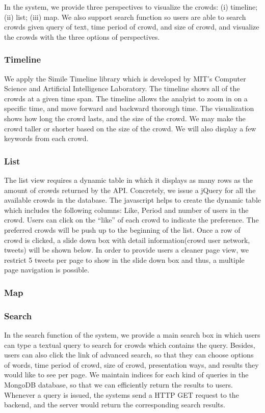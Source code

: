 \documentclass{sig-alternate}
\begin{document}
In the system, we provide three perspectives to visualize the crowds: (i) timeline;
(ii) list; (iii) map. We also support search function so users are able to search 
crowds given query of text, time period of crowd, and size of crowd, and visualize
the crowds with the three options of perspectives.

\subsubsection{Timeline}

We apply the Simile Timeline library which is developed by MIT's Computer
Science and Artificial Intelligence Laboratory. The timeline shows all of the
crowds at a given time span.  The timeline allows the analyist to zoom in on a
specific time, and move forward and backward thorough time.  The visualization
shows how long the crowd lasts, and the size of the crowd. We may make the
crowd taller or shorter based on the size of the crowd.  We will also display a
few keywords from each crowd.

\subsubsection{List}

The list view requires a dynamic table in which it displays as many rows as the
amount of crowds returned by the API. Concretely, we issue a jQuery for all the
available crowds in the database. The javascript helps to create the dynamic
table which includes the following columns: Like, Period and number of users in the crowd. Users can click on the ``like'' of each crowd to indicate the preference. The preferred crowds will be push up to the beginning of the list. Once a row of crowd is clicked, a slide down box with detail information(crowd user network, tweets) will be shown below. In order to provide users a cleaner page view, we restrict 5 tweets per page to show in the slide down box and thus, a multiple page navigation is possible.

\subsubsection{Map}

\subsubsection{Search}

In the search function of the system, we provide a main search box in which 
users can type a textual query to search for crowds which contains the query.
Besides, users can also click the link of advanced search, so that they can 
choose options of words, time period of crowd, size of crowd, presentation ways,
and results they would like to see per page. We maintain indices for each kind
of queries in the MongoDB database, so that we can efficiently return the results
to users. Whenever a query is issued, the systems send a HTTP GET request to the
backend, and the server would return the corresponding search results.
\end{document}
